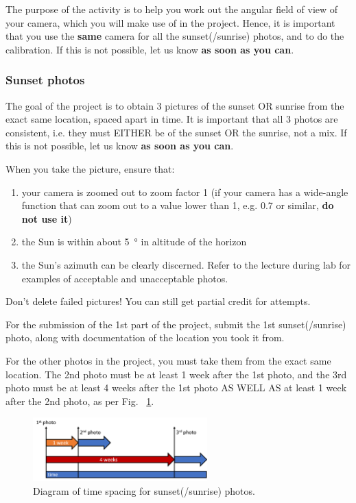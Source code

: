 \documentclass[main.tex]{subfiles}
\begin{document}
The purpose of the activity is to help you work out the angular field of view of your camera, which you will make use of in the project. Hence, it is important that you use the \textbf{same} camera for all the sunset(/sunrise) photos, and to do the calibration. If this is not possible, let us know \textbf{as soon as you can}.

\subsubsection{Sunset photos}
The goal of the project is to obtain 3 pictures of the sunset OR sunrise from the exact same location, spaced apart in time. It is important that all 3 photos are consistent, i.e. they must EITHER be of the sunset OR the sunrise, not a mix. If this is not possible, let us know \textbf{as soon as you can}.

When you take the picture, ensure that:
\begin{enumerate}
\item your camera is zoomed out to zoom factor 1 (if your camera has a wide-angle function that can zoom out to a value lower than 1, e.g. 0.7 or similar, \textbf{do not use it})
\item the Sun is within about \SI{5}{\degree} in altitude of the horizon
\item the Sun's azimuth can be clearly discerned. Refer to the lecture during lab for examples of acceptable and unacceptable photos.
\end{enumerate}
Don't delete failed pictures! You can still get partial credit for attempts.

For the submission of the 1st part of the project, submit the 1st sunset(/sunrise) photo, along with documentation of the location you took it from.

For the other photos in the project, you must take them from the exact same location. The 2nd photo must be at least 1 week after the 1st photo, and the 3rd photo must be at least 4 weeks after the 1st photo AS WELL AS at least 1 week after the 2nd photo, as per Fig. ~\ref{fig:phottime}.
\begin{figure}[htb]
\begin{center}
\includegraphics[width=0.6\textwidth]{photo_time.png}
\caption{Diagram of time spacing for sunset(/sunrise) photos.}
\label{fig:phottime}
\end{center}
\end{figure}
\end{document}
